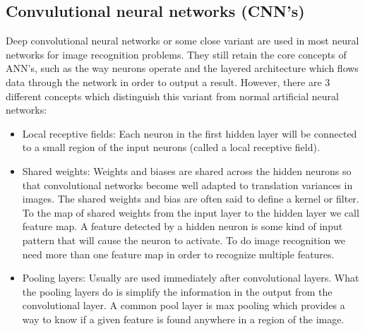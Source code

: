 \documentclass[journal,compsoc]{IEEEtran}
\begin{document}
\subsection{Convulutional neural networks (CNN's)}
Deep convolutional neural networks or some close variant are used in most neural networks for image recognition problems\cite{?}. They still retain the core concepts of ANN's, such as the way neurons operate and the layered architecture which flows data through the network in order to output a result. However, there are 3 different concepts which distinguish this variant from normal artificial neural networks:
\begin{itemize}
\item Local receptive fields: Each neuron in the first hidden layer will be connected to a small region of the input neurons (called a local receptive field).
\item Shared weights: Weights and biases are shared across the hidden neurons so that convolutional networks become well adapted to translation variances in images. The shared weights and bias are often said to define a kernel or filter. To the map of shared weights from the input layer to the hidden layer we call feature map. A feature detected by a hidden neuron is some kind of input pattern that will cause the neuron to activate. To do image recognition we need more than one feature map in order to recognize multiple features.
\item Pooling layers: Usually are used immediately after convolutional layers. What the pooling layers do is simplify the information in the output from the convolutional layer. A common pool layer is max pooling which provides a way to know if a given feature is found anywhere in a region of the image.\cite{Nielsen2017a} 
\end{itemize}
\end{document}
